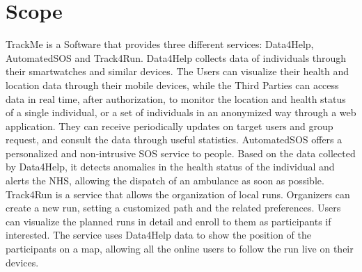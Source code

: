 \section{Scope}
TrackMe is a Software that provides three different services: Data4Help, AutomatedSOS and Track4Run.
Data4Help collects data of individuals through their smartwatches and similar devices. The Users can visualize their health and location data through their mobile devices, while the Third Parties can access data in real time, after authorization, to monitor the location and health status of a single individual, or a set of individuals in an anonymized way through a web application. They can receive periodically updates on target users and group request, and consult the data through useful statistics.
AutomatedSOS offers a personalized and non-intrusive SOS service to  people. Based on the data collected by Data4Help, it detects anomalies in the health status of the individual and alerts the NHS, allowing the dispatch of an ambulance as soon as possible.
Track4Run is a service that allows the organization of local runs. Organizers can create a new run, setting a customized path and the related preferences. Users can visualize the planned runs in detail and enroll to them as participants if interested. The service uses Data4Help data to show the position of the participants on a map, allowing all the online users to follow the run live on their devices.

